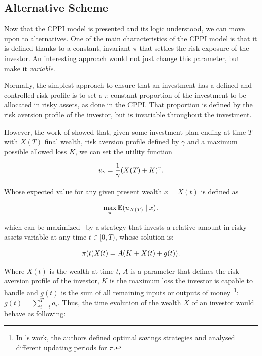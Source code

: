 \subsection{Alternative Scheme}

Now that the CPPI model is presented and its logic understood, we can move upon to alternatives. One of the main characteristics of the CPPI model is that it is defined thanks to a constant, invariant $\pi$ that settles the risk exposure of the investor. An interesting approach would not just change this parameter, but make it \emph{variable}.

Normally, the simplest approach to ensure that an investment has a defined and controlled risk profile is to set a $\pi$ constant proportion of the investment to be allocated in risky assets, as done in the CPPI. That proportion is defined by the risk aversion profile of the investor, but is invariable throughout the investment.

However, the work of \cite{a:guillen-optimisation} showed that, given some investment plan ending at time $T$ with $X(T)$ final wealth, risk aversion profile defined by $\gamma$ and a maximum possible allowed loss $K$, we can set the utility function

\begin{align}
    u_\gamma = \frac{1}{\gamma}\qty(X(T) + K)^\gamma \emph{.}
\end{align}

Whose expected value for any given present wealth $x = X(t)$ is defined as

\begin{align}\label{eq:maxE}
    \max_{\pi}\EX\giventhat{u_{X(T)}}{x} \emph{,}
\end{align}

which can be maximized~\cite{a:guillen-optimisation} by a strategy that invests a relative amount in risky assets variable at any time $t \in [0,T)$, whose solution is:

\begin{align}\label{eq:the_formula}
    \pi(t)X(t) = A\qty(K + X(t) + g(t)) \textit{.}
\end{align}

Where $X(t)$ is the wealth at time $t$, $A$ is a parameter that defines the risk aversion profile of the investor, $K$ is the maximum loss the investor is capable to handle and $g(t)$ is the sum of all remaining inputs or outputs of money~\footnote{In \cite{a:donnelly-savings-decisions}'s work, the authors defined optimal savings strategies and analysed different updating periods for $\pi$.}: $g(t) = \sum_{i=t}^{T}a_i$. Thus, the time evolution of the wealth $X$ of an investor would behave as following:

